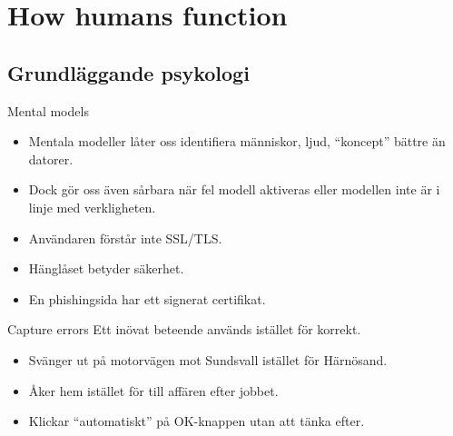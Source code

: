 


\section{How humans function}

\subsection{Grundläggande psykologi}

\begin{frame}
  \begin{block}{Mental models}
    \begin{itemize}
      \item Mentala modeller låter oss identifiera människor, ljud, 
        \enquote{koncept} bättre än datorer.

      \item Dock gör oss även sårbara när fel modell aktiveras eller modellen 
        inte är i linje med verkligheten.
    \end{itemize}
  \end{block}

  \pause{}

  \begin{example}
    \begin{itemize}
      \item Användaren förstår inte SSL/TLS\@.
      \item Hänglåset betyder säkerhet.
      \item En phishingsida har ett signerat certifikat.
    \end{itemize}
  \end{example}
\end{frame}

\begin{frame}
  \begin{block}{Capture errors}
    Ett inövat beteende används istället för korrekt.
  \end{block}

  \pause{}

  \begin{example}
    \begin{itemize}
      \item Svänger ut på motorvägen mot Sundsvall istället för Härnösand.
      \item Åker hem istället för till affären efter jobbet.
      \item Klickar \enquote{automatiskt} på OK-knappen utan att tänka efter.
    \end{itemize}
  \end{example}
\end{frame}

